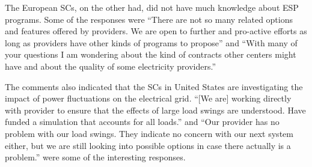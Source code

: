 The European SCs, on the other had, did not have much knowledge about ESP programs. Some of the responses were ``There are not so many related options and features offered by providers. We are open to further and pro-active efforts as long as providers have other kinds of programs to propose'' and ``With many of your questions I am wondering about the kind of contracts other centers might have and about the quality of some electricity providers.''

The comments also indicated that the SCs in United States are investigating the impact of power fluctuations on the electrical grid. ``[We are] working directly with provider to ensure that the effects of large load swings are understood. Have funded a simulation that accounts for all loads.'' and ``Our provider has no problem with our load swings. They indicate no concern with our next system either, but we are still looking into possible options in case there actually is a problem.'' were some of the interesting responses.
